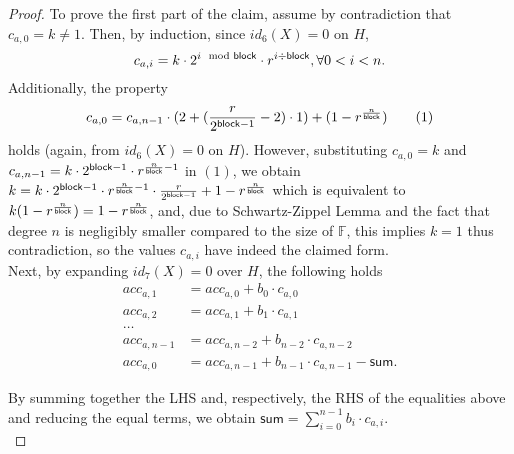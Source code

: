 \begin{proof}
To prove the first part of the claim, assume by contradiction that $c_{a,0} = k  \neq 1$. 
Then, by induction, since $id_6(X) = 0$ on $H$, 
$$c_{a,i} = k \cdot 2^{i \mod {\mathsf{block}}} \cdot r^{i \div \mathsf{block}}, \forall 0<i<n.$$ 
Additionally, the property
\begin{align*} 
c_{a,0} = c_{a,n-1} \cdot (2+ (\frac{r}{2^{\mathsf{block} -1}} -2) \cdot 1) + (1 - r^{\frac{n}{\mathsf{block}}}) \tag{1}
\end{align*}  
\noindent holds (again, from $id_6(X) = 0$ on $H$). However, substituting $c_{a,0} = k$ 
and $c_{a,n-1} = k \cdot 2^{\mathsf{block} -1} \cdot r^{\frac{n}{\mathsf{block}} -1}$ in $(1)$, we obtain 
$k = k \cdot 2^{\mathsf{block} -1} \cdot r^{\frac{n}{\mathsf{block}} -1} \cdot \frac{r}{2^{\mathsf{block} -1}} +1 - r^{\frac{n}{\mathsf{block}}}$ which is equivalent to 
$k(1 - r^{\frac{n}{\mathsf{block}}}) = 1 - r^{\frac{n}{\mathsf{block}}}$, and, due to Schwartz-Zippel Lemma and the fact that degree $n$ is negligibly 
smaller compared to the size of $\mathbb{F}$, this implies \ewnp $k =1$ thus contradiction,
so the values $c_{a,i}$ have indeed the claimed form. \\
Next, by expanding $id_7(X) = 0$ over $H$, the following holds
\begin{align*}
acc_{a,1} &= acc_{a,0} + b_0 \cdot c_{a,0} \\
acc_{a,2} &= acc_{a,1} + b_1\cdot c_{a,1} \\
\ldots \\
acc_{a,n-1} &= acc_{a,n-2} + b_{n-2} \cdot c_{a,n-2} \\
acc_{a,0} &= acc_{a,n-1} + b_{n-1} \cdot c_{a,n-1} - \mathsf{sum}.
\end{align*}

\noindent By summing together the LHS and, respectively, the RHS of the equalities above and 
reducing the equal terms, we obtain $\mathsf{sum} = \sum_{i=0}^{n-1}b_i\cdot c_{a,i}$. \\


\end{proof}
